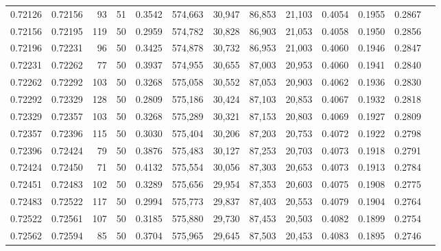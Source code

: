 \begin{tabular}{rrrrrrrrrrrrr}
0.72126 & 0.72156 &    93 &  51 &                                     0.3542 & 574,663 &  30,947 &  86,853 &  21,103 & 0.4054 & 0.1955 & 0.2867 \\
0.72156 & 0.72195 &   119 &  50 &                                     0.2959 & 574,782 &  30,828 &  86,903 &  21,053 & 0.4058 & 0.1950 & 0.2856 \\
0.72196 & 0.72231 &    96 &  50 &                                     0.3425 & 574,878 &  30,732 &  86,953 &  21,003 & 0.4060 & 0.1946 & 0.2847 \\
0.72231 & 0.72262 &    77 &  50 &                                     0.3937 & 574,955 &  30,655 &  87,003 &  20,953 & 0.4060 & 0.1941 & 0.2840 \\
0.72262 & 0.72292 &   103 &  50 &                                     0.3268 & 575,058 &  30,552 &  87,053 &  20,903 & 0.4062 & 0.1936 & 0.2830 \\
0.72292 & 0.72329 &   128 &  50 &                                     0.2809 & 575,186 &  30,424 &  87,103 &  20,853 & 0.4067 & 0.1932 & 0.2818 \\
0.72329 & 0.72357 &   103 &  50 &                                     0.3268 & 575,289 &  30,321 &  87,153 &  20,803 & 0.4069 & 0.1927 & 0.2809 \\
0.72357 & 0.72396 &   115 &  50 &                                     0.3030 & 575,404 &  30,206 &  87,203 &  20,753 & 0.4072 & 0.1922 & 0.2798 \\
0.72396 & 0.72424 &    79 &  50 &                                     0.3876 & 575,483 &  30,127 &  87,253 &  20,703 & 0.4073 & 0.1918 & 0.2791 \\
0.72424 & 0.72450 &    71 &  50 &                                     0.4132 & 575,554 &  30,056 &  87,303 &  20,653 & 0.4073 & 0.1913 & 0.2784 \\
0.72451 & 0.72483 &   102 &  50 &                                     0.3289 & 575,656 &  29,954 &  87,353 &  20,603 & 0.4075 & 0.1908 & 0.2775 \\
0.72483 & 0.72522 &   117 &  50 &                                     0.2994 & 575,773 &  29,837 &  87,403 &  20,553 & 0.4079 & 0.1904 & 0.2764 \\
0.72522 & 0.72561 &   107 &  50 &                                     0.3185 & 575,880 &  29,730 &  87,453 &  20,503 & 0.4082 & 0.1899 & 0.2754 \\
0.72562 & 0.72594 &    85 &  50 &                                     0.3704 & 575,965 &  29,645 &  87,503 &  20,453 & 0.4083 & 0.1895 & 0.2746 \\

\end{tabular}
